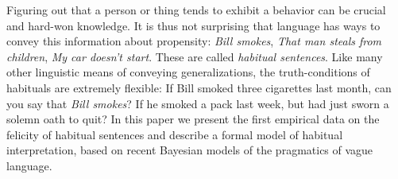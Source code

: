 \documentclass[10pt,letterpaper]{article}
\begin{document}
Figuring out that a person or thing tends to exhibit a behavior can be crucial and hard-won knowledge.
It is thus not surprising that language has ways to convey this information about propensity:
\emph{Bill smokes}, \emph{That man steals from children}, \emph{My car doesn't start}.
These are called \emph{habitual sentences}.
Like many other linguistic means of conveying generalizations, the truth-conditions of habituals are extremely flexible:
If Bill smoked three cigarettes last month, can you say that \emph{Bill smokes}? %
If he smoked a pack last week, but had just sworn a solemn oath to quit?
In this paper we present the first empirical data on the felicity of habitual sentences and describe a formal model of habitual interpretation, based on recent Bayesian models of the pragmatics of vague language.





\end{document}
